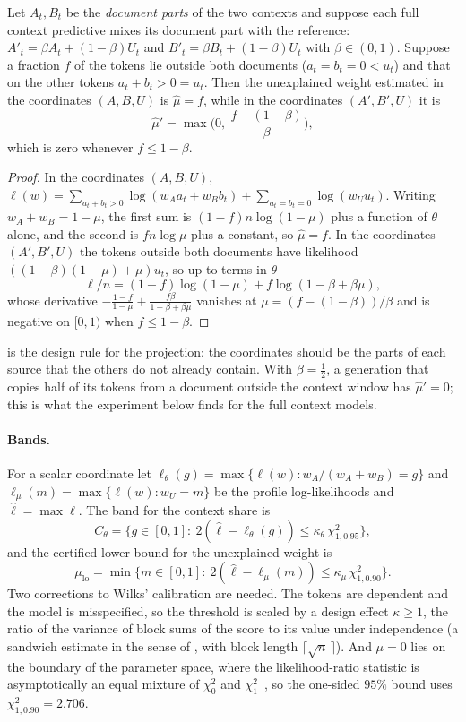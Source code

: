 \begin{proposition}\label{prop:absorbed}
Let $A_t,B_t$ be the \emph{document parts} of the two contexts and suppose each full context
predictive mixes its document part with the reference: $A'_t=\beta A_t+(1-\beta)U_t$ and
$B'_t=\beta B_t+(1-\beta)U_t$ with $\beta\in(0,1)$. Suppose a fraction $f$ of the tokens lie outside
both documents ($a_t=b_t=0<u_t$) and that on the other tokens $a_t+b_t>0=u_t$. Then the unexplained weight
estimated in the coordinates $(A,B,U)$ is $\hat\mu=f$, while in the coordinates $(A',B',U)$ it is
\[
\hat\mu'=\max\Big(0,\ \frac{f-(1-\beta)}{\beta}\Big),
\]
which is zero whenever $f\le1-\beta$.
\end{proposition}
\begin{proof}
In the coordinates $(A,B,U)$, $\ell(w)=\sum_{a_t+b_t>0}\log(w_Aa_t+w_Bb_t)+\sum_{a_t=b_t=0}\log(w_Uu_t)$.
Writing $w_A+w_B=1-\mu$, the first sum is $(1-f)n\log(1-\mu)$ plus a function of $\theta$ alone, and
the second is $fn\log\mu$ plus a constant, so $\hat\mu=f$. In the coordinates $(A',B',U)$ the tokens
outside both documents have likelihood $((1-\beta)(1-\mu)+\mu)u_t$, so up to terms in $\theta$
\[
\ell/n=(1-f)\log(1-\mu)+f\log(1-\beta+\beta\mu),
\]
whose derivative $-\frac{1-f}{1-\mu}+\frac{f\beta}{1-\beta+\beta\mu}$ vanishes at
$\mu=(f-(1-\beta))/\beta$ and is negative on $[0,1)$ when $f\le1-\beta$.
\end{proof}

 is the design rule for the projection: the coordinates should be the parts of
each source that the others do not already contain. With $\beta=\tfrac12$, a generation that copies
half of its tokens from a document outside the context window has $\hat\mu'=0$; this is what the
experiment below finds for the full context models.

\paragraph{Bands.} For a scalar coordinate let $\ell_\theta(g)=\max\{\ell(w):w_A/(w_A+w_B)=g\}$ and
$\ell_\mu(m)=\max\{\ell(w):w_U=m\}$ be the profile log-likelihoods and $\hat\ell=\max\ell$. The band for
the context share is
\[
C_\theta=\{g\in[0,1]:\ 2(\hat\ell-\ell_\theta(g))\le\kappa_\theta\,\chi^2_{1,0.95}\},
\]
and the certified lower bound for the unexplained weight is
\[
\mu_{\mathrm{lo}}=\min\{m\in[0,1]:\ 2(\hat\ell-\ell_\mu(m))\le\kappa_\mu\,\chi^2_{1,0.90}\}.
\]
Two corrections to Wilks' calibration are needed. The tokens are dependent and the model is
misspecified, so the threshold is scaled by a design effect $\kappa\ge1$, the ratio of the variance
of block sums of the score to its value under independence (a sandwich estimate in the sense of
\cite{White1982}, with block length $\lceil\sqrt n\,\rceil$). And $\mu=0$ lies on the boundary of
the parameter space, where the likelihood-ratio statistic is asymptotically an equal mixture of
$\chi^2_0$ and $\chi^2_1$~\cite{Chernoff1954,SelfLiang1987}, so the one-sided $95\%$ bound uses
$\chi^2_{1,0.90}=2.706$.

